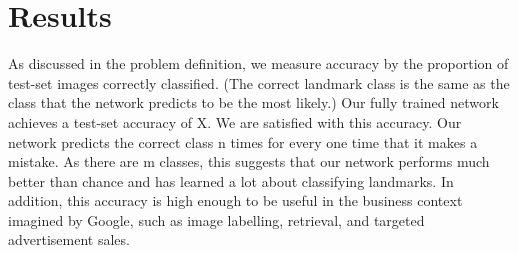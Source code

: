 \section{Results}
As discussed in the problem definition, we measure accuracy by the proportion of test-set images correctly classified. (The correct landmark class is the same as the class that the network predicts to be the most likely.) Our fully trained network achieves a test-set accuracy of X. We are satisfied with this accuracy. Our network predicts the correct class n times for every one time that it makes a mistake. As there are m classes, this suggests that our network performs much better than chance and has learned a lot about classifying landmarks. In addition, this accuracy is high enough to be useful in the business context imagined by Google, such as image labelling, retrieval, and targeted advertisement sales.